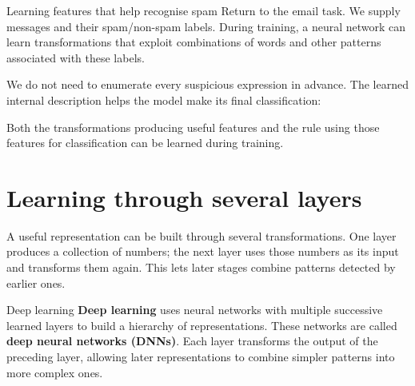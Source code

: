 \documentclass[a4paper,12pt,oneside]{report}
\begin{document}
\begin{framedexample}{Learning features that help recognise spam}
Return to the email task. We supply messages and their spam/non-spam
labels. During training, a neural network can learn transformations
that exploit combinations of words and other patterns associated
with these labels.

We do not need to enumerate every suspicious expression in advance.
The learned internal description helps the model make its final
classification:
\begin{center}
\end{center}
Both the transformations producing useful features and the rule
using those features for classification can be learned during
training.
\end{framedexample}

\section{Learning through several layers}

A useful representation can be built through several transformations.
One layer produces a collection of numbers; the next layer uses
those numbers as its input and transforms them again.
This lets later stages combine patterns detected by earlier ones.

\begin{frameddefn}{Deep learning}\label{def:deep-learning}
\textbf{Deep learning} uses neural networks with multiple successive
learned layers to build a hierarchy of representations.
These networks are called \textbf{deep neural networks (DNNs)}.
Each layer transforms the output of the preceding layer, allowing
later representations to combine simpler patterns into more
complex ones.
\end{frameddefn}
\end{document}
